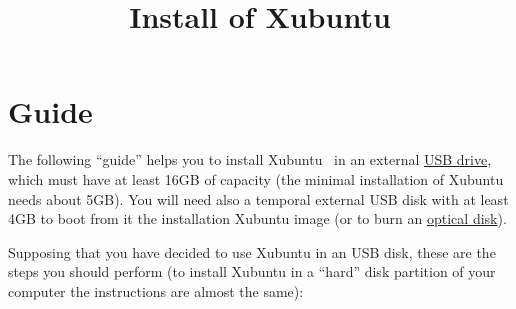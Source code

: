 \title{Install of Xubuntu}

\maketitle

\section{Guide}

The following ``guide'' helps you to install Xubuntu~\cite{xubuntu} in an
external \href{https://en.wikipedia.org/wiki/USB_flash_drive}{USB
drive}, which must have at least 16GB of capacity (the minimal
installation of Xubuntu needs about 5GB). You will need also a
temporal external USB disk with at least 4GB to boot from it the
installation Xubuntu image (or to burn
an \href{https://en.wikipedia.org/wiki/Optical_disc}{optical disk}).

Supposing that you have decided to use Xubuntu in an USB disk,
these are the steps you should perform (to install Xubuntu in a ``hard'' disk
partition of your computer the instructions are almost the same):

